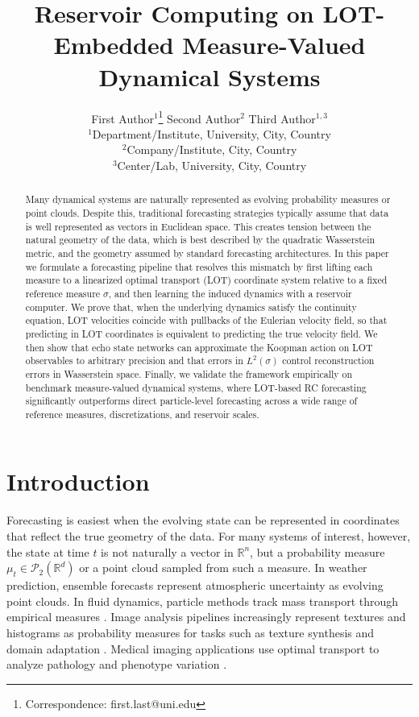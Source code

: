 \documentclass[11pt]{article}
\title{Reservoir Computing on LOT-Embedded Measure-Valued Dynamical Systems}
\author{
  First Author$^{1}$\thanks{Correspondence: first.last@uni.edu}\quad
  Second Author$^{2}$\quad
  Third Author$^{1,3}$\\[0.5ex]
  {\small $^{1}$Department/Institute, University, City, Country}\\
  {\small $^{2}$Company/Institute, City, Country}\\
  {\small $^{3}$Center/Lab, University, City, Country}
}
\date{}
\newcommand{\R}{\mathbb{R}}
\newcommand{\1}{\mathbf{1}}
\begin{document}
\maketitle

\begin{abstract}

Many dynamical systems are naturally represented as evolving probability measures or point clouds. Despite this, traditional forecasting strategies typically assume that data is well represented as vectors in Euclidean space. This creates tension between the natural geometry of the data, which is best described by the quadratic Wasserstein metric, and the geometry assumed by standard forecasting architectures. In this paper we formulate a forecasting pipeline that resolves this mismatch by first lifting each measure to a linearized optimal transport (LOT) coordinate system relative to a fixed reference measure $\sigma$, and then learning the induced dynamics with a reservoir computer. We prove that, when the underlying dynamics satisfy the continuity equation, LOT velocities coincide with pullbacks of the Eulerian velocity field, so that predicting in LOT coordinates is equivalent to predicting the true velocity field. We then show that echo state networks can approximate the Koopman action on LOT observables to arbitrary precision and that errors in $L^2(\sigma)$ control reconstruction errors in Wasserstein space. Finally, we validate the framework empirically on benchmark measure-valued dynamical systems, where LOT-based RC forecasting significantly outperforms direct particle-level forecasting across a wide range of reference measures, discretizations, and reservoir scales.  
\end{abstract}


\section{Introduction}

Forecasting is easiest when the evolving state can be represented in coordinates that reflect the true geometry of the data. For many systems of interest, however, the state at time $t$ is not naturally a vector in $\R^n$, but a probability measure $\mu_t \in \mathcal{P}_2(\R^d)$ or a point cloud sampled from such a measure. In weather prediction, ensemble forecasts represent atmospheric uncertainty as evolving point clouds. In fluid dynamics, particle methods track mass transport through empirical measures \cite{benamou2000computational}. Image analysis pipelines increasingly represent textures and histograms as probability measures for tasks such as texture synthesis and domain adaptation \cite{kolouri2017optimal,rubner2000earth}. Medical imaging applications use optimal transport to analyze pathology and phenotype variation \cite{wang2010optimal,basu14}. 
\end{document}
